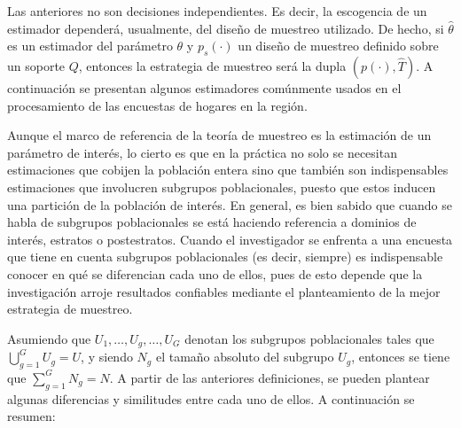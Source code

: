 \documentclass[
  12pt,
]{book}
\begin{document}
Las anteriores no son decisiones independientes. Es decir, la escogencia de un estimador dependerá, usualmente, del diseño de muestreo utilizado. De hecho, si \(\hat\theta\) es un estimador del parámetro \(\theta\) y \(p_s(\cdot)\) un diseño de muestreo definido sobre un soporte \(Q\), entonces la estrategia de muestreo será la dupla \((p(\cdot),\hat{T})\). A continuación se presentan algunos estimadores comúnmente usados en el procesamiento de las encuestas de hogares en la región.

Aunque el marco de referencia de la teoría de muestreo es la estimación de un parámetro de interés, lo cierto es que en la práctica no solo se necesitan estimaciones que cobijen la población entera sino que también son indispensables estimaciones que involucren subgrupos poblacionales, puesto que estos inducen una partición de la población de interés. En general, es bien sabido que cuando se habla de subgrupos poblacionales se está haciendo referencia a dominios de interés, estratos o postestratos. Cuando el investigador se enfrenta a una encuesta que tiene en cuenta subgrupos poblacionales (es decir, siempre) es indispensable conocer en qué se diferencian cada uno de ellos, pues de esto depende que la investigación arroje resultados confiables mediante el planteamiento de la mejor estrategia de muestreo.

Asumiendo que \(U_1, \ldots, U_g, \ldots, U_G\) denotan los subgrupos poblacionales tales que \(\bigcup_{g=1}^GU_g=U\), y siendo \(N_g\) el tamaño absoluto del subgrupo \(U_g\), entonces se tiene que \(\sum_{g=1}^G N_g=N\). A partir de las anteriores definiciones, se pueden plantear algunas diferencias y similitudes entre cada uno de ellos. A continuación se resumen:
\end{document}
